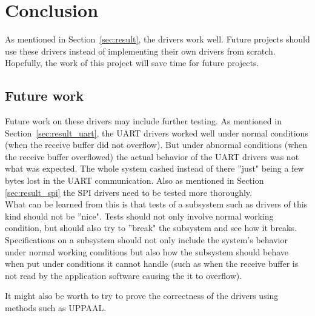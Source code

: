 
\section{Conclusion}\label{sec:conclusion}
As mentioned in Section~\ref{sec:result}, the drivers work well. Future projects should use these drivers instead of implementing their own drivers from scratch. Hopefully, the work of this project will save time for future projects.

\subsection{Future work}
Future work on these drivers may include further testing. As mentioned in Section~\ref{sec:result_uart}, the UART drivers worked well under normal conditions (when the receive buffer did not overflow). But under abnormal conditions (when the receive buffer overflowed) the actual behavior of the UART drivers was not what was expected. The whole system cashed instead of there ''just" being a few bytes lost in the UART communication. Also as mentioned in Section \ref{sec:result_spi} the SPI drivers need to be tested more thoroughly. \\
What can be learned from this is that tests of a subsystem such as drivers of this kind should not be ''nice". Tests should not only involve normal working condition, but should also try to ''break" the subsystem and see how it breaks. Specifications on a subsystem should not only include the system's behavior under normal working conditions but also how the subsystem should behave when put under conditions it cannot handle (such as when the receive buffer is not read by the application software causing the it to overflow).

It might also be worth to try to prove the correctness of the drivers using methods such as UPPAAL.